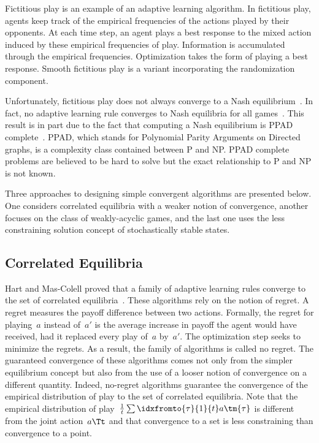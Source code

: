 Fictitious play is an example of an adaptive learning algorithm.
In fictitious play, agents keep track of the empirical frequencies of the actions played by their opponents.
At each time step, an agent plays a best response to the mixed action induced by these empirical frequencies of play.
Information is accumulated through the empirical frequencies.
Optimization takes the form of playing a best response.
Smooth fictitious play is a variant incorporating the randomization component.

Unfortunately, fictitious play does not always converge to a Nash equilibrium~\cite{shapley:1963}.
In fact, no adaptive learning rule converges to Nash equilibria for all games~\cite{hart_mas-colell:2003}.
This result is in part due to the fact that computing a Nash equilibrium is PPAD complete~\cite{daskalakis_goldberg_papadimitriou:2006}.
PPAD, which stands for Polynomial Parity Arguments on Directed graphs, is a complexity class contained between P and NP.
PPAD complete problems are believed to be hard to solve but the exact relationship to P and NP is not known.

Three approaches to designing simple convergent algorithms are presented below.
One considers correlated equilibria with a weaker notion of convergence, another focuses on the class of weakly-acyclic games, and the last one uses the less constraining solution concept of stochastically stable states.

\subsection{Correlated Equilibria}
Hart and Mas-Colell proved that a family of adaptive learning rules converge to the set of correlated equilibria~\cite{hart_mas-colell:2000:simple,hart_mas-colell:2000:general,hart_mas-colell:2001}.
These algorithms rely on the notion of regret.
A regret measures the payoff difference between two actions.
Formally, the regret for playing~\(a\) instead of~\(a'\) is the average increase in payoff the agent would have received, had it replaced every play of~\(a\) by~\(a'\).
The optimization step seeks to minimize the regrets.
As a result, the family of algorithms is called no regret.
The guaranteed convergence of these algorithms comes not only from the simpler equilibrium concept but also from the use of a looser notion of convergence on a different quantity.
Indeed, no-regret algorithms guarantee the convergence of the empirical distribution of play to the set of correlated equilibria.
Note that the empirical distribution of play~\(\frac{1}{t} \sum\idxfromto{\tau}{1}{t} a\tm{\tau}\) is different from the joint action~\(a\Tt\) and that convergence to a set is less constraining than convergence to a point.

